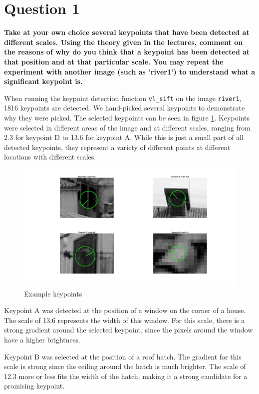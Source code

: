 \section*{Question 1}

{\bfseries Take at your own choice several keypoints that have been
detected at different scales. Using the theory given in the lectures, comment on
the reasons of why do you think that a keypoint has been detected at that position
and at that particular scale. You may repeat the experiment with another image
(such as 'river1') to understand what a significant keypoint is.}

When running the keypoint detection function \texttt{vl\_sift} on the image \texttt{river1}, 1816 keypoints are detected. We hand-picked several keypoints to demonstrate why they were picked. The selected keypoints can be seen in figure \ref{fig:keypoint01}. Keypoints were selected in different areas of the image and at different scales, ranging from 2.3 for keypoint D to 13.6 for keypoint A. While this is just a small part of all detected keypoints, they represent a variety of different points at different locations with different scales.

\begin{figure}[!hbt]
  \includegraphics[width=\textwidth]{img/keypoint01}
  \caption{Example keypoints}
  \label{fig:keypoint01}
\end{figure}

Keypoint A was detected at the position of a window on the corner of a house. The scale of 13.6 represents the width of this window. For this scale, there is a strong gradient around the selected keypoint, since the pixels around the window have a higher brightness.  

Keypoint B was selected at the position of a roof hatch. The gradient for this scale is strong since the ceiling around the hatch is much brighter. The scale of 12.3 more or less fits the width of the hatch, making it a strong candidate for a promising keypoint.

